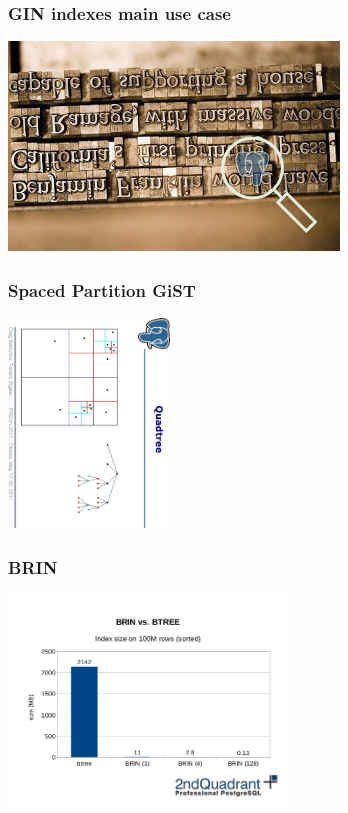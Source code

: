 \documentclass{beamer}
\begin{document}
\begin{frame}[fragile]
  \frametitle{GIN indexes main use case}

  \vfill

  \begin{center}
    \includegraphics[height=15em]{pg_doc_search.jpg}
  \end{center}
\end{frame}

\begin{frame}[fragile]
  \frametitle{Spaced Partition GiST}

  \vfill

  \begin{center}
    \includegraphics[angle=90,height=15em]{sp-gist.eps}
  \end{center}
\end{frame}

\begin{frame}[fragile]
  \frametitle{BRIN}

  \vfill
  
  \begin{center}
    \includegraphics[height=15em]{brin.jpg}
  \end{center}
\end{frame}
\end{document}
